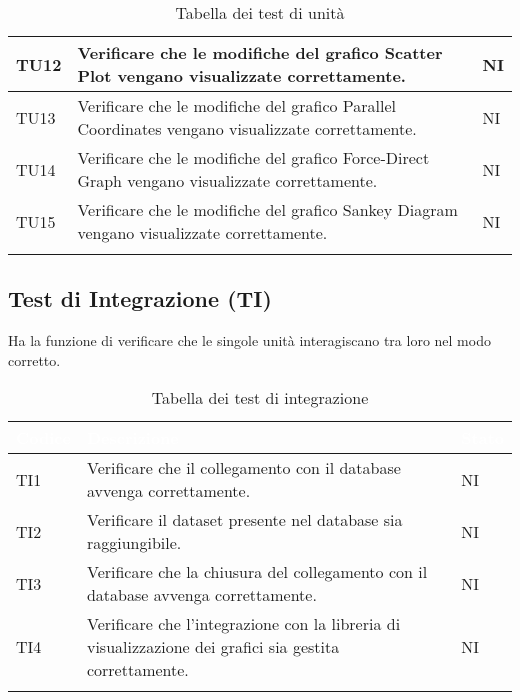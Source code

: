 \begin{center}
\begin{longtable}{|p{1.5cm}|p{11cm}|p{1cm}|}
            TU12 & Verificare che le modifiche del grafico Scatter Plot vengano visualizzate correttamente. & NI\\ \hline
            \rowcolor[HTML]{EFEFEF}
            TU13 & Verificare che le modifiche del grafico Parallel Coordinates vengano visualizzate correttamente. & NI\\ \hline
            \rowcolor[HTML]{C0C0C0}
            TU14 & Verificare che le modifiche del grafico Force-Direct Graph vengano visualizzate correttamente. & NI\\ \hline
            \rowcolor[HTML]{EFEFEF}
            TU15 & Verificare che le modifiche del grafico Sankey Diagram vengano visualizzate correttamente. & NI\\ \hline
            \caption{Tabella dei test di unità}
        \end{longtable}
    \end{center}

    \subsection{Test di Integrazione (TI)} Ha la funzione di verificare che le singole unità interagiscano tra loro nel modo corretto.
    \begin{center}
        \renewcommand\arraystretch{1.5}
        \centering
        \begin{longtable}{|p{1.5cm}|p{11cm}|p{1cm}|}
        \hline
        \rowcolor[HTML]{036400}
        \textcolor{white}{\textbf{Codice}} & \textcolor{white}{\textbf{Descrizione}} & \textcolor{white}{\textbf{Stato}} \\ \hline
            \rowcolor[HTML]{EFEFEF}
            TI1 & Verificare che il collegamento con il database avvenga correttamente. & NI\\ \hline
            \rowcolor[HTML]{C0C0C0}
            TI2 & Verificare il dataset presente nel database sia raggiungibile. & NI\\ \hline
            \rowcolor[HTML]{EFEFEF}
            TI3 & Verificare che la chiusura del collegamento con il database avvenga correttamente. & NI\\ \hline
            \rowcolor[HTML]{C0C0C0}
            TI4 & Verificare che l’integrazione con la libreria di visualizzazione dei grafici sia gestita correttamente. & NI\\ \hline   
            \caption{Tabella dei test di integrazione}
        \end{longtable}
    \end{center}

